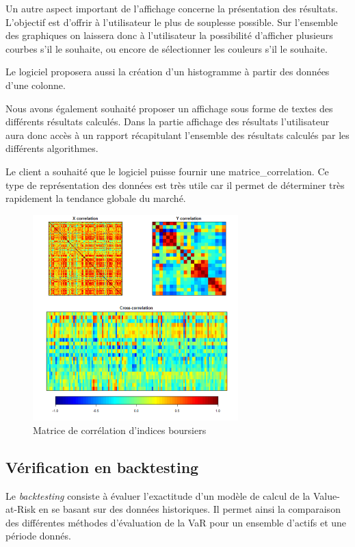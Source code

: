 		Un autre aspect important de l'affichage concerne la présentation des résultats. L'objectif est d'offrir à l'utilisateur le plus de souplesse possible. Sur l'ensemble des graphiques on laissera donc à l'utilisateur la possibilité d'afficher plusieurs courbes s'il le souhaite, ou encore de sélectionner les couleurs s'il le souhaite.

		Le logiciel proposera aussi la création d'un histogramme à partir des données d'une colonne.

		Nous avons également souhaité proposer un affichage sous forme de textes des différents résultats calculés. Dans la partie affichage des résultats l'utilisateur aura donc accès à un rapport récapitulant l'ensemble des résultats calculés par les différents algorithmes.

		Le client a souhaité que le logiciel puisse fournir une \gls{matrice_correlation}. Ce type de représentation des données est très utile car il permet de déterminer très rapidement la tendance globale du marché.

		\begin{figure}[h]
			\center
			\includegraphics[width=300px]{matrice.png}
			\caption{Matrice de corrélation d'indices boursiers}
		\end{figure}


	\subsection{Vérification en backtesting}
		Le \textit{backtesting} consiste à évaluer l'exactitude d'un modèle de calcul de la Value-at-Risk en se basant sur des données historiques. Il permet ainsi la comparaison des différentes méthodes d'évaluation de la VaR pour un ensemble d'actifs et une période donnés.

